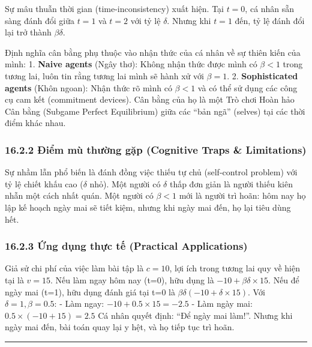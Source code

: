 \documentclass[
]{article}
\begin{document}
Sự mâu thuẫn thời gian (time-inconsistency) xuất hiện. Tại \(t=0\), cá
nhân sẵn sàng đánh đổi giữa \(t=1\) và \(t=2\) với tỷ lệ \(\delta\).
Nhưng khi \(t=1\) đến, tỷ lệ đánh đổi lại trở thành \(\beta\delta\).

Định nghĩa cân bằng phụ thuộc vào nhận thức của cá nhân về sự thiên kiến
của mình: 1. \textbf{Naive agents} (Ngây thơ): Không nhận thức được mình
có \(\beta < 1\) trong tương lai, luôn tin rằng tương lai mình sẽ hành
xử với \(\beta = 1\). 2. \textbf{Sophisticated agents} (Khôn ngoan):
Nhận thức rõ mình có \(\beta < 1\) và có thể sử dụng các công cụ cam kết
(commitment devices). Cân bằng của họ là một Trò chơi Hoàn hảo Cân bằng
(Subgame Perfect Equilibrium) giữa các ``bản ngã'' (selves) tại các thời
điểm khác nhau.

\subsubsection{16.2.2 Điểm mù thường gặp (Cognitive Traps \&
Limitations)}\label{ux111iux1ec3m-muxf9-thux1b0ux1eddng-gux1eb7p-cognitive-traps-limitations-112}

Sự nhầm lẫn phổ biến là đánh đồng việc thiếu tự chủ (self-control
problem) với tỷ lệ chiết khấu cao (\(\delta\) nhỏ). Một người có
\(\delta\) thấp đơn giản là người thiếu kiên nhẫn một cách nhất quán.
Một người có \(\beta < 1\) mới là người trì hoãn: hôm nay họ lập kế
hoạch ngày mai sẽ tiết kiệm, nhưng khi ngày mai đến, họ lại tiêu dùng
hết.

\subsubsection{16.2.3 Ứng dụng thực tế (Practical
Applications)}\label{ux1ee9ng-dux1ee5ng-thux1ef1c-tux1ebf-practical-applications-68}

Giả sử chi phí của việc làm bài tập là \(c=10\), lợi ích trong tương lai
quy về hiện tại là \(v=15\). Nếu làm ngay hôm nay (t=0), hữu dụng là
\(-10 + \beta \delta \times 15\). Nếu để ngày mai (t=1), hữu dụng đánh
giá tại t=0 là \(\beta \delta (-10 + \delta \times 15)\). Với
\(\delta=1, \beta=0.5\): - Làm ngay: \(-10 + 0.5 \times 15 = -2.5\) -
Làm ngày mai: \(0.5 \times (-10 + 15) = 2.5\) Cá nhân quyết định: ``Để
ngày mai làm!''. Nhưng khi ngày mai đến, bài toán quay lại y hệt, và họ
tiếp tục trì hoãn.

\begin{center}\rule{0.5\linewidth}{0.5pt}\end{center}
\end{document}
